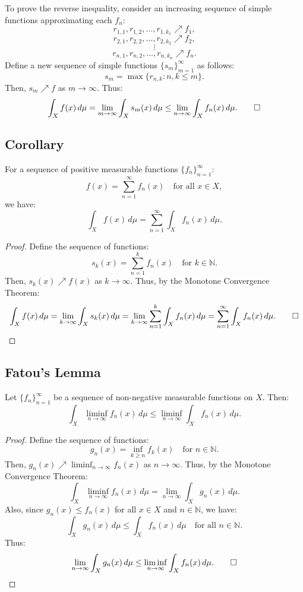 \documentclass[11pt]{article}
\begin{document}
To prove the reverse inequality, consider an increasing sequence of simple functions approximating each \(f_n\):
\[r_{1,1}, r_{1,2}, \ldots, r_{1,k_1} \nearrow f_1,\]
\[r_{2,1}, r_{2,2}, \ldots, r_{2,k_2} \nearrow f_2,\]
\[\vdots\]
\[r_{n,1}, r_{n,2}, \ldots, r_{n,k_n} \nearrow f_n.\]
Define a new sequence of simple functions \(\{s_m\}_{m=1}^{\infty}\) as follows:
\[s_m = \max\{r_{n,k} : n, k \leq m\}.\]
Then, \(s_m \nearrow f\) as \(m \to \infty\). Thus:
\[\int_X f(x) \,d\mu = \lim_{m \to \infty} \int_X s_m(x) \,d\mu \leq \lim_{n \to \infty} \int_X f_n(x) \,d\mu. \qed\]

\subsection{Corollary}
For a sequence of positive measurable functions \(\{f_n\}_{n=1}^{\infty}\):
\[f(x) = \sum_{n=1}^{\infty} f_n(x) \quad \text{for all } x \in X,\]
we have:
\[\int_X f(x) \,d\mu = \sum_{n=1}^{\infty} \int_X f_n(x) \,d\mu.\]

\begin{proof}
Define the sequence of functions:
\[s_k(x) = \sum_{n=1}^{k} f_n(x) \quad \text{for } k \in \mathbb{N}.\]
Then, \(s_k(x) \nearrow f(x)\) as \(k \to \infty\). Thus, by the Monotone Convergence Theorem:
\[\int_X f(x) \,d\mu = \lim_{k \to \infty} \int_X s_k(x) \,d\mu = \lim_{k \to \infty} \sum_{n=1}^{k} \int_X f_n(x) \,d\mu = \sum_{n=1}^{\infty} \int_X f_n(x) \,d\mu. \qed\]
\end{proof}
\subsection{Fatou's Lemma}
Let \(\{f_n\}_{n=1}^{\infty}\) be a sequence of non-negative measurable functions on \(X\). Then:
\[\int_X \liminf_{n \to \infty} f_n(x) \,d\mu \leq \liminf_{n \to \infty} \int_X f_n(x) \,d\mu.\]
\begin{proof}
Define the sequence of functions:
\[g_n(x) = \inf_{k \geq n} f_k(x) \quad \text{for } n \in \mathbb{N}.\]
Then, \(g_n(x) \nearrow \liminf_{n \to \infty} f_n(x)\) as \(n \to \infty\). Thus, by the Monotone Convergence Theorem:
\[\int_X \liminf_{n \to \infty} f_n(x) \,d\mu = \lim_{n \to \infty} \int_X g_n(x) \,d\mu.\]
Also, since \(g_n(x) \leq f_n(x)\) for all \(x \in X\) and \(n \in \mathbb{N}\), we have:
\[\int_X g_n(x) \,d\mu \leq \int_X f_n(x) \,d\mu \quad \text{for all } n \in \mathbb{N}.\]
Thus:
\[\lim_{n \to \infty} \int_X g_n(x) \,d\mu \leq \liminf_{n \to \infty} \int_X f_n(x) \,d\mu. \qed\]
\end{proof}
\end{document}
